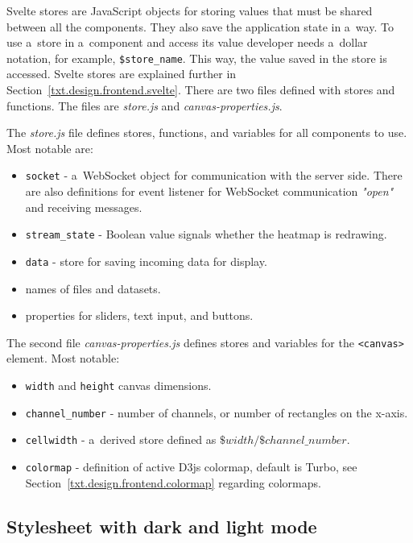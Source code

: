 Svelte stores are JavaScript objects for storing values that must be shared between all the components. They also save the application state in a~way. To use a~store in a~component and access its value developer needs a~dollar notation, for example, \texttt{\$store\_name}. This way, the value saved in the store is accessed. Svelte stores are explained further in Section~\ref{txt.design.frontend.svelte}. There are two files defined with stores and functions. The files are \textit{store.js} and \textit{canvas-properties.js}. \newline\newline

The \textit{store.js} file defines stores, functions, and variables for all components to use. Most notable are: 
\begin{itemize}
    \item \verb|socket| - a~WebSocket object for communication with the server side. There are also definitions for event listener for WebSocket communication \textit{"open"} and receiving messages. 
    \item \verb|stream_state| - Boolean value signals whether the heatmap is redrawing.
    \item \verb|data| - store for saving incoming data for display.
    \item names of files and datasets.
    \item properties for sliders, text input, and buttons.
\end{itemize}

The second file \textit{canvas-properties.js} defines stores and variables for the \verb|<canvas>| element. Most notable:

\begin{itemize}
    \item \verb|width| and \verb|height| canvas dimensions.
    \item \verb|channel_number| - number of channels, or number of rectangles on the x-axis.
    \item \verb|cellwidth| - a~derived store defined as $\$width/\$channel\_number$.
    \item \verb|colormap| - definition of active D3js colormap, default is Turbo, see Section~\ref{txt.design.frontend.colormap} regarding colormaps.
\end{itemize}

\subsection{Stylesheet with dark and light mode}

